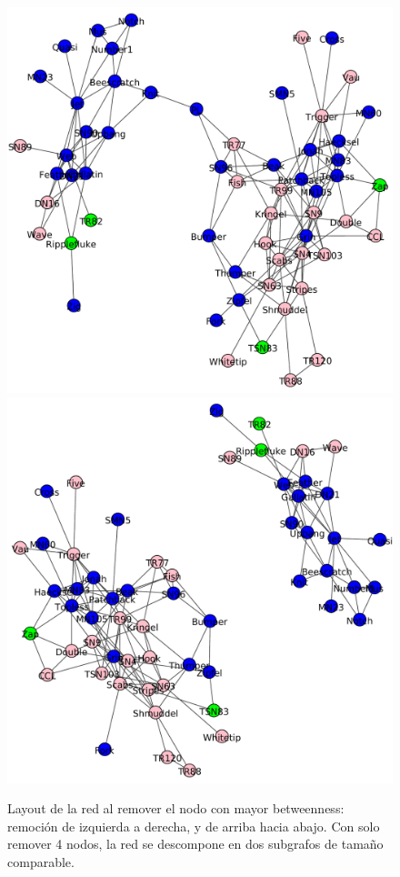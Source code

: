 \begin{figure}
\includegraphics[scale = 0.28]{figuras/Parte_c2-eps-converted-to.pdf} 
\includegraphics[scale = 0.28]{figuras/Parte_c3-eps-converted-to.pdf} 
\caption{Layout de la red al remover el nodo con mayor betweenness: remoción de izquierda a derecha, y de arriba hacia abajo. Con solo remover 4 nodos, la red se descompone en dos subgrafos de tamaño comparable.}
\label{fig:Betweenness}
\end{figure}

